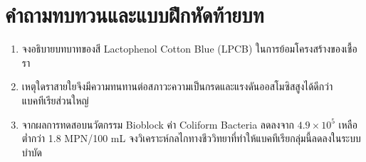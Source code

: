 \section{คำถามทบทวนและแบบฝึกหัดท้ายบท}
\begin{enumerate}
    \item จงอธิบายบทบาทของสี Lactophenol Cotton Blue (LPCB) ในการย้อมโครงสร้างของเชื้อรา
    \item เหตุใดราสายใยจึงมีความทนทานต่อสภาวะความเป็นกรดและแรงดันออสโมซิสสูงได้ดีกว่าแบคทีเรียส่วนใหญ่
    \item จากผลการทดสอบนวัตกรรม Bioblock ค่า Coliform Bacteria ลดลงจาก $4.9 \times 10^5$ เหลือต่ำกว่า 1.8 MPN/100 mL จงวิเคราะห์กลไกทางชีววิทยาที่ทำให้แบคทีเรียกลุ่มนี้ลดลงในระบบบำบัด
\end{enumerate}
